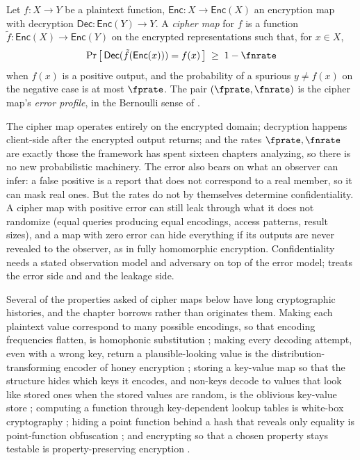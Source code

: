 \begin{definition}
\label{def:cipher-map}
Let $f : X \to Y$ be a plaintext function, $\mathsf{Enc} : X \to
\mathsf{Enc}(X)$ an encryption map with decryption $\mathsf{Dec} :
\mathsf{Enc}(Y) \to Y$. A \emph{cipher map} for $f$ is a function
$\tilde f : \mathsf{Enc}(X) \to \mathsf{Enc}(Y)$ on the encrypted
representations such that, for $x \in X$,
\[
  \Pr\left[\,\mathsf{Dec}(\tilde f(\mathsf{Enc}(x))) = f(x)\,\right]
  \;\ge\; 1 - \fnrate
\]
when $f(x)$ is a positive output, and the probability of a spurious
$y \ne f(x)$ on the negative case is at most $\fprate$. The pair
$(\fprate, \fnrate)$ is the cipher map's \emph{error profile}, in the
Bernoulli sense of .
\end{definition}

The cipher map operates entirely on the encrypted domain; decryption
happens client-side after the encrypted output returns; and the rates
$\fprate, \fnrate$ are exactly those the framework has spent sixteen
chapters analyzing, so there is no new probabilistic machinery. The error
also bears on what an observer can infer: a false positive is a report
that does not correspond to a real member, so it can mask real ones. But
the rates do not by themselves determine confidentiality. A cipher map
with positive error can still leak through what it does not randomize
(equal queries producing equal encodings, access patterns, result sizes),
and a map with zero error can hide everything if its outputs are never
revealed to the observer, as in fully homomorphic encryption.
Confidentiality needs a stated observation model and adversary on top of
the error model;  treats the error side
and  and 
the leakage side.

Several of the properties asked of cipher maps below have long
cryptographic histories, and the chapter borrows rather than originates
them. Making each plaintext value correspond to many possible encodings,
so that encoding frequencies flatten, is homophonic substitution
\parencite{jendal-kuhn-massey-1989}; making
every decoding attempt, even with a wrong key, return a plausible-looking
value is the distribution-transforming encoder of honey encryption
\parencite{juels-ristenpart-2014}; storing a key-value map so
that the structure hides which keys it encodes, and non-keys decode to
values that look like stored ones when the stored values are random, is
the oblivious key-value store
\parencite{garimella-et-al-2021,bienstock-et-al-2023};
computing a function through key-dependent lookup tables is white-box
cryptography \parencite{chow-et-al-2002}; hiding a point
function behind a hash that reveals only equality is point-function
obfuscation \parencite{canetti-1997,lynn-prabhakaran-sahai-2004}; and
encrypting so that a chosen property stays testable is property-preserving
encryption \parencite{pandey-rouselakis-2012}.

